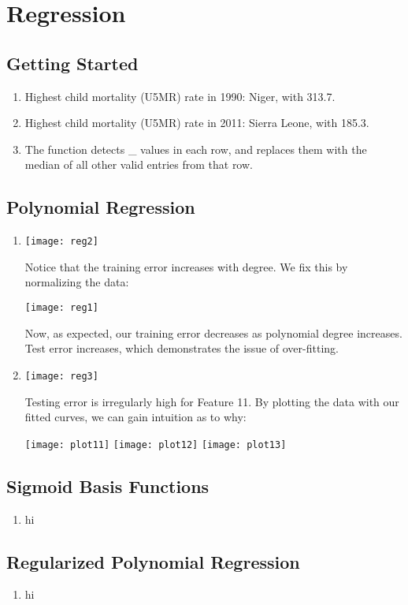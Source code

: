\documentclass{article}
\begin{document}
\section{Regression}
\subsection{Getting Started}

\begin{enumerate}
\item Highest child mortality (U5MR) rate in 1990: Niger, with 313.7.
\item Highest child mortality (U5MR) rate in 2011: Sierra Leone, with 185.3.
\item The function detects \_ values in each row, and replaces
  them with the median of all other valid entries from that row.
\end{enumerate}

\subsection{Polynomial Regression}

\begin{enumerate}
\item \begin{center}
  \texttt{[image: reg2]}
\end{center}
  Notice that the training error increases with degree. We fix this
  by normalizing the data:
  \begin{center}
      \texttt{[image: reg1]}
  \end{center}
  Now, as expected, our training error decreases as polynomial degree
  increases. Test error increases, which demonstrates the issue
  of over-fitting.
\item \begin{center}
  \texttt{[image: reg3]}
\end{center}
  Testing error is irregularly high for Feature 11. By plotting
  the data with our fitted curves, we can gain intuition as to why:
  \begin{center}
    \texttt{[image: plot11]}
    \texttt{[image: plot12]}
    \texttt{[image: plot13]}
  \end{center}
\end{enumerate}

\subsection{Sigmoid Basis Functions}

\begin{enumerate}
  \item hi
\end{enumerate}

\subsection{Regularized Polynomial Regression}

\begin{enumerate}
  \item hi
\end{enumerate}
\end{document}

